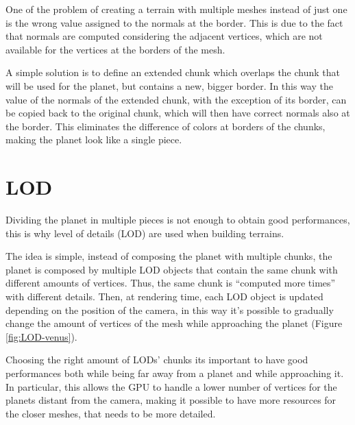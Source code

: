 \documentclass[paper=a4, fontsize=11pt]{scrartcl} %
\numberwithin{equation}{section} %
\numberwithin{figure}{section} %
\numberwithin{table}{section} %
\theoremstyle{definition}
\begin{document}
One of the problem of creating a terrain with multiple meshes instead of just
one is the wrong value assigned to the normals at the border. This is due to
the fact that normals are computed considering the adjacent vertices, which
are not available for the vertices at the borders of the mesh.

A simple solution is to define an extended chunk which overlaps the
chunk that will be used for the planet, but contains a new, bigger border.
In this way the value of the normals of the extended chunk, with the exception
of its border, can be copied back to the original chunk, which will then have
correct normals also at the border. This eliminates the difference of colors
at borders of the chunks, making the planet look like a single piece.


\section{LOD}

Dividing the planet in multiple pieces is not enough to obtain good
performances, this is why level of details (LOD) are used when building
terrains.

The idea is simple, instead of composing the planet with multiple chunks,
the planet is composed by multiple LOD objects that contain the same
chunk with different amounts of vertices. Thus, the same chunk is ``computed
more times'' with different details. Then, at rendering time, each LOD
object is updated depending on the position of the camera, in this way it's
possible to gradually change the amount of vertices of the mesh while
approaching the planet (Figure \ref{fig:LOD-venus}).

Choosing the right amount of LODs' chunks its important to have good
performances both while being far away from a planet and while approaching it.
In particular, this allows the GPU to handle a lower number of vertices
for the planets distant from the camera, making it possible to have more
resources for the closer meshes, that needs to be more detailed.
\end{document}
